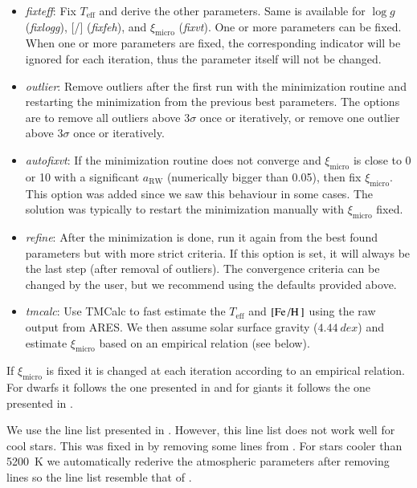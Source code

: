 \documentclass{aa}
\begin{document}
\begin{itemize}
    \item \emph{fixteff}: Fix $T_\mathrm{eff}$ and derive the other parameters.
          Same is available for $\log g$ (\emph{fixlogg}), [/]
          (\emph{fixfeh}), and $\xi_\mathrm{micro}$ (\emph{fixvt}). One or more parameters
          can be fixed. When one or more parameters are fixed, the corresponding
          indicator will be ignored for each iteration, thus the parameter itself
          will not be changed.
    \item \emph{outlier}: Remove outliers after the first run with the minimization
          routine and restarting the minimization from the previous best
          parameters. The options are to remove all outliers above $3\sigma$
          once or iteratively, or remove one outlier above $3\sigma$ once or
          iteratively.
    \item \emph{autofixvt}: If the minimization routine does not converge and
          $\xi_\mathrm{micro}$ is close to 0 or 10 with a significant
          $a_\mathrm{RW}$ (numerically bigger than 0.05), then fix
          $\xi_\mathrm{micro}$. This option was added since we saw this behaviour
          in some cases. The solution was typically to restart the minimization
          manually with $\xi_\mathrm{micro}$ fixed.
    \item \emph{refine}: After the minimization is done, run it again from the best
          found parameters but with more strict criteria. If this option is set,
          it will always be the last step (after removal of outliers). The
          convergence criteria can be changed by the user, but we recommend
          using the defaults provided above.
    \item \emph{tmcalc}: Use TMCalc \citep{Sousa2012} to fast estimate the
          $T_\mathrm{eff}$ and $[\ion{Fe}/\ion{H}]$ using the raw output from
          ARES. We then assume solar surface gravity ($\SI{4.44}{dex}$) and
          estimate $\xi_\mathrm{micro}$ based on an empirical relation (see below).
\end{itemize}
If $\xi_\mathrm{micro}$ is fixed it is changed at each iteration according to an
empirical relation. For dwarfs it follows the one presented in
\citet{Tsantaki2013} and for giants it follows the one presented in
\citet{Adibekyan2015}.

We use the line list presented in \citet{Sousa2008a}. However, this line list
does not work well for cool stars. This was fixed in \citet{Tsantaki2013} by
removing some lines from \citet{Sousa2008a}. For stars cooler than \SI{5200}{K}
we automatically rederive the atmospheric parameters after removing lines so the
line list resemble that of \citet{Tsantaki2013}.
\end{document}
